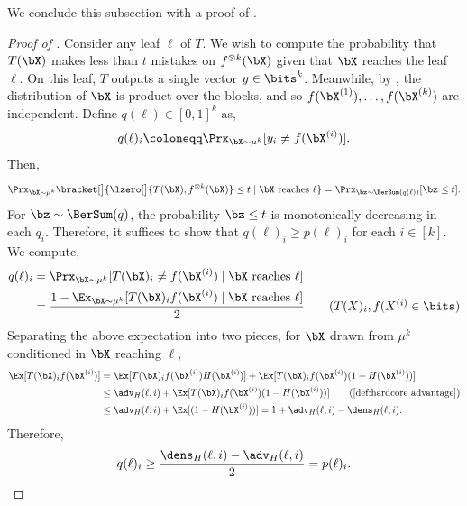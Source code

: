We conclude this subsection with a proof of .
\begin{proof}[Proof of ]
    Consider any leaf $\ell$ of $T$. We wish to compute the probability that $T(\bX)$ makes less than $t$ mistakes on $f^{\otimes k}(\bX)$ given that $\bX$ reaches the leaf $\ell$. On this leaf, $T$ outputs a single vector $y \in \bits^k$. Meanwhile, by , the distribution of $\bX$ is product over the blocks, and so $f(\bX^{(1)}), \ldots, f(\bX^{(k)})$ are independent. Define $q(\ell) \in [0,1]^k$ as,
    \begin{equation*}
        q(\ell)_i \coloneqq \Prx_{\bX \sim \mu^k}[y_i \neq f(\bX^{(i)})].
    \end{equation*}
    Then,
    \begin{equation*}
        \Prx_{\bX \sim \mu^k}\bracket[\big]{\lzero[\big]{T(\bX), f^{\otimes k}(\bX)} \leq t \mid \bX\text{ reaches }\ell} = \Prx_{\bz \sim \BerSum(q(\ell))}[\bz \leq t].
    \end{equation*}
    For $\bz \sim \BerSum(q)$, the probability $\bz \leq t$ is monotonically decreasing in each $q_i$. Therefore, it suffices to show that $q(\ell)_i \geq p(\ell)_i$ for each $i \in [k]$. We compute,
    \begin{align*}
        q(\ell)_i &= \Prx_{\bX \sim \mu^k}[T(\bX)_i \neq f(\bX^{(i)}) \mid \bX\text{ reaches }\ell] \\
        &=  \frac{1 - \Ex_{\bX \sim \mu^k}[T(\bX)_i f(\bX^{(i)}) \mid \bX\text{ reaches }\ell]}{2} \tag{$T(X)_i, f(X^{(i)} \in \bits$}
    \end{align*}
    Separating the above expectation into two pieces, for $\bX$ drawn from $\mu^k$ conditioned in $\bX$ reaching $\ell$,
    \begin{align*}
        \Ex[T(\bX)_i f(\bX^{(i)})] &= \Ex[T(\bX)_i f(\bX^{(i)})H(\bX^{(i)})] +  \Ex[T(\bX)_i f(\bX^{(i)})(1-H(\bX^{(i)}))] \\
        &\leq \adv_H(\ell,i) +  \Ex[T(\bX)_i f(\bX^{(i)})(1-H(\bX^{(i)}))] \tag{\Cref{def:hardcore advantage}}\\
        &\leq \adv_H(\ell,i) +  \Ex[(1-H(\bX^{(i)}))] = 1 +\adv_H(\ell,i) - \dens_H(\ell,i).
    \end{align*}
    Therefore,
    \begin{equation*}
        q(\ell)_i \geq \frac{\dens_H(\ell,i)- \adv_H(\ell,i)}{2} = p(\ell)_i. \qedhere
    \end{equation*}
\end{proof}

